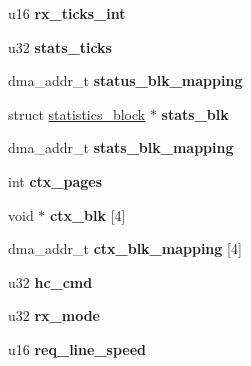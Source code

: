 \begin{DoxyCompactItemize}
\item 
\hypertarget{structbnx2_ada62391bab609ef93dedad0a5bec2a15}{
u16 {\bfseries rx\_\-ticks\_\-int}}
\label{structbnx2_ada62391bab609ef93dedad0a5bec2a15}

\item 
\hypertarget{structbnx2_a5c1c94982a2015d76cbbb07df6c927b5}{
u32 {\bfseries stats\_\-ticks}}
\label{structbnx2_a5c1c94982a2015d76cbbb07df6c927b5}

\item 
\hypertarget{structbnx2_a90b4ea55150013fda2bcd7bd5608ab2b}{
dma\_\-addr\_\-t {\bfseries status\_\-blk\_\-mapping}}
\label{structbnx2_a90b4ea55150013fda2bcd7bd5608ab2b}

\item 
\hypertarget{structbnx2_a9f3783342537f27c8f8157f7f1e99bc3}{
struct \hyperlink{structstatistics__block}{statistics\_\-block} $\ast$ {\bfseries stats\_\-blk}}
\label{structbnx2_a9f3783342537f27c8f8157f7f1e99bc3}

\item 
\hypertarget{structbnx2_a6845699fc3b8d7ff1a48594179c57515}{
dma\_\-addr\_\-t {\bfseries stats\_\-blk\_\-mapping}}
\label{structbnx2_a6845699fc3b8d7ff1a48594179c57515}

\item 
\hypertarget{structbnx2_ac5207cb899ce4ac93ac3ec9a35ed26b9}{
int {\bfseries ctx\_\-pages}}
\label{structbnx2_ac5207cb899ce4ac93ac3ec9a35ed26b9}

\item 
\hypertarget{structbnx2_ad3d7b9a441cb0b708b04da047499d4c1}{
void $\ast$ {\bfseries ctx\_\-blk} \mbox{[}4\mbox{]}}
\label{structbnx2_ad3d7b9a441cb0b708b04da047499d4c1}

\item 
\hypertarget{structbnx2_ae24704c0df4b5e067d91e188725a13d9}{
dma\_\-addr\_\-t {\bfseries ctx\_\-blk\_\-mapping} \mbox{[}4\mbox{]}}
\label{structbnx2_ae24704c0df4b5e067d91e188725a13d9}

\item 
\hypertarget{structbnx2_a6073d5c97f1101c6ef55e89a76bf6e36}{
u32 {\bfseries hc\_\-cmd}}
\label{structbnx2_a6073d5c97f1101c6ef55e89a76bf6e36}

\item 
\hypertarget{structbnx2_a03bc2380ae1ee342bb9da90e2bfa6e71}{
u32 {\bfseries rx\_\-mode}}
\label{structbnx2_a03bc2380ae1ee342bb9da90e2bfa6e71}

\item 
\hypertarget{structbnx2_abcbc5f21e8dc32233efe7d106b838b4e}{
u16 {\bfseries req\_\-line\_\-speed}}
\label{structbnx2_abcbc5f21e8dc32233efe7d106b838b4e}


\end{DoxyCompactItemize}

